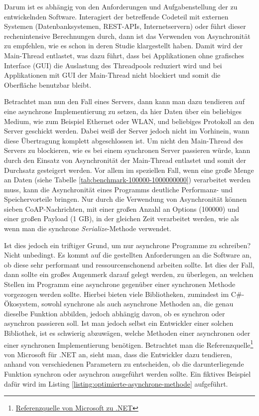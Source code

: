 Darum ist es abhängig von den Anforderungen und Aufgabenstellung der zu entwickelnden Software. Interagiert der betreffende Codeteil mit externen Systemen (Datenbanksystemen, REST-APIs, Internetservern) oder führt dieser rechenintensive Berechnungen durch, dann ist das Verwenden von Asynchronität zu empfehlen, wie es schon \citeauthor{okur2014study} in deren Studie  \autocite{okur2014study} klargestellt haben. Damit wird der Main-Thread entlastet, was dazu führt, dass bei Applikationen ohne grafisches Interface (GUI) die Auslastung des Threadpools reduziert wird und bei Applikationen mit GUI der Main-Thread nicht blockiert und somit die Oberfläche benutzbar bleibt.

Betrachtet man nun den Fall eines Servers, dann kann man dazu tendieren auf eine asynchrone Implementierung zu setzen, da hier Daten über ein beliebiges Medium, wie zum Beispiel Ethernet oder WLAN, und beliebiges Protokoll an den Server geschickt werden. Dabei weiß der Server jedoch nicht im Vorhinein, wann diese Übertragung komplett abgeschlossen ist. Um nicht den Main-Thread des Servers zu blockieren, wie es bei einem synchronen Server passieren würde, kann durch den Einsatz von Asynchronität der Main-Thread entlastet und somit der Durchsatz gesteigert werden. Vor allem im speziellen Fall, wenn eine große Menge an Daten (siehe Tabelle \ref{tab:benchmark-100000-1000000000}) verarbeitet werden muss, kann die Asynchronität eines Programms deutliche Performanz- und Speichervorteile bringen. Nur durch die Verwendung von Asynchronität können sieben CoAP-Nachrichten, mit einer großen Anzahl an Options (100000) und einer großen Payload (1 GB), in der gleichen Zeit verarbeitet werden, wie als wenn man die synchrone \textit{Serialize}-Methode verwendet.

Ist dies jedoch ein triftiger Grund, um nur asynchrone Programme zu schreiben? Nicht unbedingt. Es kommt auf die gestellten Anforderungen an die Software an, ob diese sehr performant und ressourcenschonend arbeiten sollte. Ist dies der Fall, dann sollte ein großes Augenmerk darauf gelegt werden, zu überlegen, an welchen Stellen im Programm eine asynchrone gegenüber einer synchronen Methode vorgezogen werden sollte. Hierbei bieten viele Bibliotheken, zumindest im C\#-Ökosystem, sowohl synchrone als auch asynchrone Methoden an, die genau dieselbe Funktion abbilden, jedoch abhängig davon, ob es synchron oder asynchron passieren soll. Ist man jedoch selbst ein Entwickler einer solchen Bibliothek, ist es schwierig abzuwägen, welche Methoden einer asynchronen oder einer synchronen Implementierung benötigen. Betrachtet man die Referenzquelle\footnote{\href{https://github.com/microsoft/referencesource}{Referenzquelle von Microsoft zu .NET}} von Microsoft für .NET an, sieht man, dass die Entwickler dazu tendieren, anhand von verschiedenen Parametern zu entscheiden, ob die darunterliegende Funktion synchron oder asynchron ausgeführt werden sollte. Ein fiktives Beispiel dafür wird im Listing \ref{listing:optimierte-asynchrone-methode} aufgeführt.

